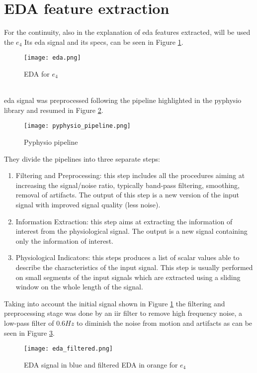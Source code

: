 \section{EDA feature extraction}
For the continuity, also in the explanation of \gls{eda} features extracted, will be used the $e_4$ Its \gls{eda} signal and its specs, can be seen in Figure \ref{fig:eda}.
\begin{figure}[h]
    \centering
    \texttt{[image: eda.png]} 
	\caption{EDA for $e_4$}
    \label{fig:eda}
\end{figure}
\\
\gls{eda} signal was preprocessed following the pipeline highlighted in the pyphysio library \cite{bizzego2019pyphysio} and resumed in Figure \ref{fig:pyphysio_pipeline}.
\begin{figure}[h]
    \centering
    \texttt{[image: pyphysio\_pipeline.png]} 
	\caption{Pyphysio pipeline}
    \label{fig:pyphysio_pipeline}
\end{figure}
\newpage
They divide the pipelines into three separate steps:
\begin{enumerate}
	\item Filtering and Preprocessing: this step includes all the procedures aiming at increasing the signal/noise ratio, typically band-pass filtering, smoothing, removal of artifacts. The output of this step is a new version of the input signal with improved signal quality (less noise).
	\item Information Extraction: this step aims at extracting the information of interest from the physiological signal. The output is a new signal containing only the information of interest.
	\item Physiological Indicators: this steps produces a list of scalar values able to describe the characteristics of the input signal. This step is usually performed on small segments of the input signals which are extracted using a sliding window on the whole length of the signal.
\end{enumerate}
Taking into account the initial signal shown in Figure \ref{fig:eda} the filtering and preprocessing stage was done by an \gls{iir} filter to remove high frequency noise, a low-pass filter of $0.6Hz$ to diminish the noise from motion and artifacts as can be seen in Figure \ref{fig:eda_filtered}.
\begin{figure}[h]
    \centering
    \texttt{[image: eda\_filtered.png]} 
	\caption{EDA signal in blue and filtered EDA in orange for $e_4$}
    \label{fig:eda_filtered}
\end{figure}
